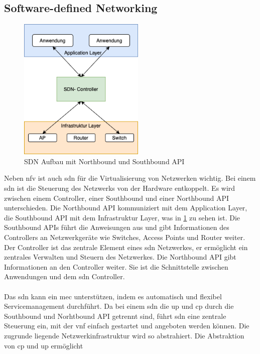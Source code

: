 \documentclass[runningheads]{llncs}
\numberwithin{figure}{section}
\begin{document}
\subsection{Software-defined Networking}
\label{subsec:Software-defined Networking}
\begin{figure}[h]
  \centering
  \includegraphics[width=6cm]{images/SDN.png}
  \caption{SDN Aufbau mit Northbound und Southbound API}
  \label{sdn1}
\end{figure}
Neben \acrshort{nfv} ist auch \acrlong{sdn} für die Virtualisierung von Netzwerken wichtig.
Bei einem \acrshort{sdn} ist die Steuerung des Netzwerks von der Hardware entkoppelt. Es wird zwischen einem Controller, 
einer Southbound und einer Northbound API unterschieden. Die Northbound API kommuniziert mit dem Application Layer,
die Southbound API mit dem Infrastruktur Layer, was in \ref{sdn1} zu sehen ist.
Die Southbound APIs führt die Anweisungen aus und gibt Informationen des Controllers an Netzwerkgeräte wie Switches,
Access Points und Router weiter. Der Controller ist das zentrale Element eines \acrshort{sdn} Netzwerkes, 
er ermöglicht ein zentrales Verwalten und Steuern des 
Netzwerkes. Die Northbound API gibt Informationen an den Controller weiter. Sie ist die Schnittstelle zwischen Anwendungen 
und dem \acrshort{sdn} Controller.\cite{SoftwareDefinedNetworkingSDN} \cite{arnold5GRadioAccess2017}
\\
\\
Das \acrlong{sdn} kann ein \acrshort{mec} unterstützen, indem es automatisch und flexibel Servicemanagement durchführt.
Da bei einem \acrshort{sdn} die \acrfull{up} und \acrfull{cp} durch die Southbound und Norhtbound API getrennt sind, 
führt \acrshort{sdn} eine zentrale Steuerung ein, 
mit der \acrshort{vnf} einfach gestartet und angeboten werden können. 
Die zugrunde liegende Netzwerkinfrastruktur wird so abstrahiert. Die Abstraktion von \acrshort{cp} und \acrshort{up} ermöglicht
\end{document}
